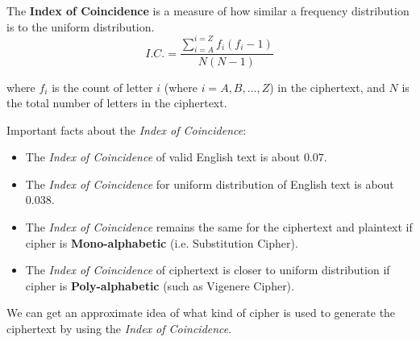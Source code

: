 \documentclass[10pt,twoside]{article}
\begin{document}
The \textbf{Index of Coincidence} is a measure of how similar a frequency distribution is to the uniform distribution.
$$ I.C. = \frac{\sum_{i=A}^{i=Z} f_i(f_i-1)}{N(N-1)}$$

where $f_i$ is the count of letter $i$ (where $i = A,B,...,Z$) in the ciphertext, and $N$ is the total number of letters in the ciphertext. \newline

Important facts about the \textit{Index of Coincidence}:
\begin{itemize}
  \setlength\itemsep{0em}
    \item The \textit{Index of Coincidence} of valid English text is about $0.07$.
    \item The \textit{Index of Coincidence} for uniform distribution of English text is about $0.038$.
    \item The \textit{Index of Coincidence} remains the same for the ciphertext and plaintext if cipher is \textbf{Mono-alphabetic} (i.e. Substitution Cipher).
    \item The \textit{Index of Coincidence} of ciphertext is closer to uniform distribution if cipher is \textbf{Poly-alphabetic} (such as Vigenere Cipher).
\end{itemize}

We can get an approximate idea of what kind of cipher is used to generate the ciphertext by using the \textit{Index of Coincidence}.
\end{document}
